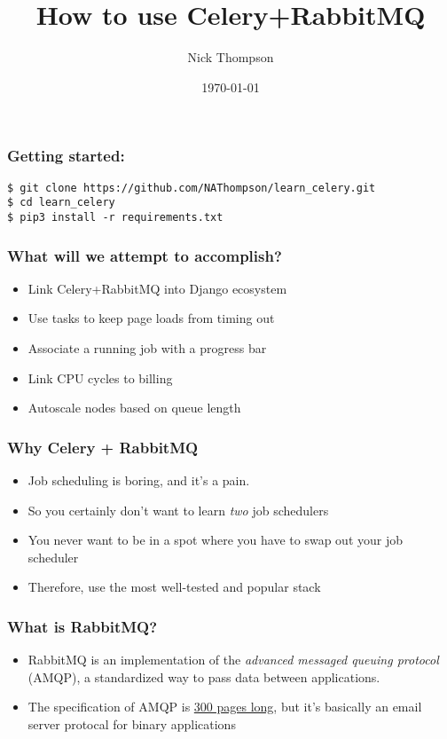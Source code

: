 \documentclass[9pt]{beamer}
\begin{document}
\title{How to use Celery+RabbitMQ}
\author{Nick Thompson} 
\date{\today}

\frame{\titlepage}

\begin{frame}[fragile]
\frametitle{Getting started:}
\begin{verbatim}
$ git clone https://github.com/NAThompson/learn_celery.git
$ cd learn_celery
$ pip3 install -r requirements.txt
\end{verbatim}
\end{frame}

\begin{frame}[fragile]
  \frametitle{What will we attempt to accomplish?}
  
  \begin{itemize}
  \item Link Celery+RabbitMQ into Django ecosystem
    \pause
  \item Use tasks to keep page loads from timing out
    \pause
  \item Associate a running job with a progress bar
    \pause
  \item Link CPU cycles to billing
    \pause
  \item Autoscale nodes based on queue length
  \end{itemize}
\end{frame}

\begin{frame}
  \frametitle{Why Celery + RabbitMQ}
  \begin{itemize}
  \item Job scheduling is boring, and it's a pain.
    \pause
  \item So you certainly don't want to learn \emph{two} job schedulers
    \pause
  \item You never want to be in a spot where you have to swap out your job scheduler
    \pause
  \item Therefore, use the most well-tested and popular stack
  \end{itemize}
\end{frame}

\begin{frame}
  \frametitle{What is RabbitMQ?}
  \begin{itemize}
  \item RabbitMQ is an implementation of the \emph{advanced messaged queuing protocol} (AMQP), a standardized way to pass data between applications.
  \item The specification of AMQP is \href{http://www.amqp.org/specification/0-10/amqp-org-download}{300 pages long}, but it's basically an email server protocal for binary applications
  \end{itemize}
\end{frame}
\end{document}
